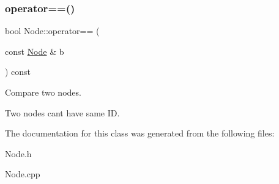 \subsubsection{\texorpdfstring{operator==()}{operator==()}}
{\footnotesize\ttfamily bool Node\+::operator== (\begin{DoxyParamCaption}\item[{const \hyperlink{class_node}{Node} \&}]{b }\end{DoxyParamCaption}) const}



Compare two nodes. 

Two nodes can\textquotesingle{}t have same ID. 

The documentation for this class was generated from the following files\+:\begin{DoxyCompactItemize}
\item 
Node.\+h\item 
Node.\+cpp\end{DoxyCompactItemize}
